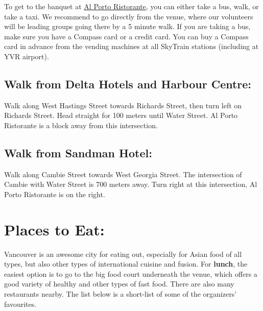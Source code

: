 \documentclass[letterpaper,12pt]{article}
\begin{document}
To get to the banquet at \href{http://www.alporto.ca}{Al Porto Ristorante}, you can either take a bus, walk, or take a taxi. We recommend to go directly from the venue, where our volunteers will be leading groups going there by a 5 minute walk. If you are taking a bus, make sure you have a Compass card or a credit card. You can buy a Compass card in advance from the vending machines at all SkyTrain stations (including at YVR airport). 
\subsection*{Walk from Delta Hotels and Harbour Centre:}

Walk along West Hastings Street towards Richards Street, then turn left on Richards Street. Head straight for 100 meters until Water Street. Al Porto Ristorante is a block away from this intersection.

\subsection*{Walk from Sandman Hotel:}

Walk along Cambie Street towards West Georgia Street. The intersection of Cambie with Water Street is 700 meters away. Turn right at this intersection, Al Porto Ristorante is on the right.

\section*{Places to Eat:}

Vancouver is an awesome city for eating out, especially for Asian food of all types, but also other types of international cuisine and fusion. For \textbf{lunch}, the easiest option is to go to the big food court underneath the venue, which offers a good variety of healthy and other types of fast food. There are also many restaurants nearby. The list below is a short-list of some of the organizers’ favourites.
\end{document}
